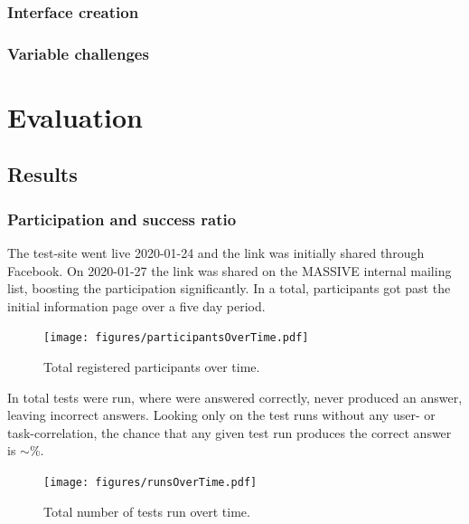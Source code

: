 \documentclass[nofilelist,dvipsnames]{cslthse-msc}
\begin{document}
			\subsection{Interface creation}

			\subsection{Variable challenges}

	\chapter{Evaluation}

		\section{Results}

			\subsection{Participation and success ratio}

				The test-site went live 2020-01-24 and the link was initially shared
				through Facebook. On 2020-01-27 the link was shared on
				the MASSIVE internal mailing list, boosting the participation
				significantly. In a total,
				 participants got past the initial information
				page over a five day period.

				\begin{figure}[h!]
					\centering
					\texttt{[image: figures/participantsOverTime.pdf]}
					\caption{Total registered participants over time.}
				\end{figure}

				In total  tests were run, where
				 were answered correctly,
				 never produced an answer, leaving
				 incorrect answers. Looking only on the test
				runs without any user- or task-correlation, the chance that any given test run
				produces the correct answer is $\sim$\%.

				\begin{figure}[h!]
					\centering
					\texttt{[image: figures/runsOverTime.pdf]}
					\caption{Total number of tests run overt time.}
				\end{figure}
\end{document}
